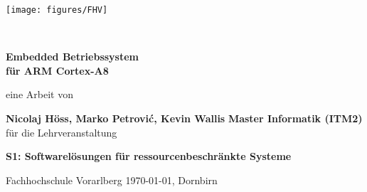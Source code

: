 \documentclass[11pt]{scrartcl}
\title{\mytitle}
\author{\myauthor}
\date{\today{}, Dornbirn}
\newcommand{\myauthor}{Nicolaj Höss, Marko Petrovi\'c, Kevin Wallis}
\newcommand{\mytitle}{Embedded Betriebssystem}
\newcommand{\mysubtitle}{für ARM Cortex-A8}
\newcommand{\myuniversity}{Fachhochschule Vorarlberg}
\newcommand{\mycourse}{S1: Softwarelösungen für ressourcenbeschränkte Systeme}
\newcommand{\mystudy}{Master Informatik (ITM2)}
\newcommand{\mydate}{\today{}, Dornbirn}
\begin{document}
\begin{titlepage}

\begin{minipage}{.5\textwidth} 
  \hspace{12cm}\hfill \texttt{[image: figures/FHV]} 
\end{minipage}\vspace{2cm} 

\begin{center}
~
\vfill\vfill\vfill

{\Huge\bfseries\mytitle} \\
{\Large\bfseries\mysubtitle}

\vfill

\Large{eine Arbeit von}

\vfill

{\LARGE\bfseries\myauthor}
\vfill
{\Large\bfseries\mystudy}
\vfill
\vfill
\Large{für die Lehrveranstaltung}

\vfill

{\LARGE\bfseries\mycourse}

\vfill\vfill\vfill
\vfill\vfill\vfill
\vfill\vfill\vfill

\myuniversity
\vfill
\mydate
\end{center}
\end{titlepage}



\thispagestyle{plain}
\tableofcontents

\newpage
\listoffigures
\newpage
\pagebreak
















\clearpage
{}
{}

\end{document}
